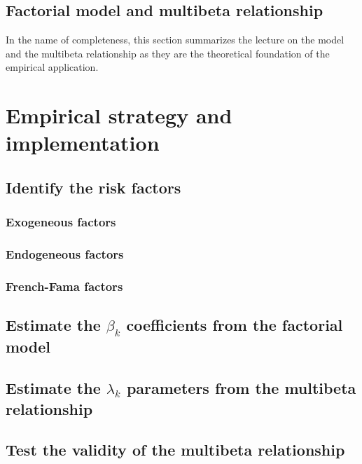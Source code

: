 \documentclass[hidelinks,11pts]{article}
\DeclareMathOperator{\1}{\mathbbm{1}}
\begin{document}



    \subsection{Factorial model and multibeta relationship}

In the name of completeness, this section summarizes the lecture on the \cite{rossArbitrageTheoryCapital1976} model and the multibeta relationship as they are the theoretical foundation of the empirical application.



\section{Empirical strategy and implementation}

    \subsection{Identify the risk factors}

        \subsubsection{Exogeneous factors}

        \subsubsection{Endogeneous factors} \label{sec:endofact}
        \subsubsection{French-Fama factors}


    \subsection{Estimate the $\beta_k$ coefficients from the factorial model}

    \subsection{Estimate the $\lambda_k$ parameters from the multibeta relationship}
    
    \subsection{Test the validity of the multibeta relationship}
\end{document}
